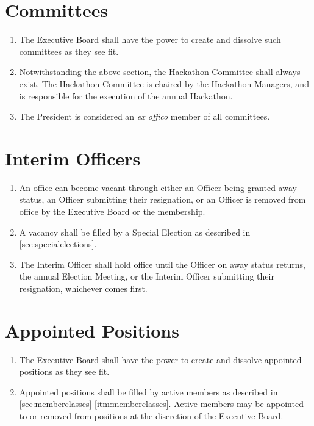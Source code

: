 \documentclass[12pt, letterpaper, oneside]{book}
\begin{document}
\section{Committees}
\begin{enumerate}
    \item The Executive Board shall have the power to create and dissolve such
        committees as they see fit.
    \item Notwithstanding the above section, the Hackathon Committee shall always
        exist. The Hackathon Committee is chaired by the Hackathon Managers, and
        is responsible for the execution of the annual Hackathon.
    \item The President is considered an \emph{ex offico} member of all
        committees.
\end{enumerate}

\section{Interim Officers}
\begin{enumerate}
    \item An office can become vacant through either an Officer being granted
        away status, an Officer submitting their resignation, or an Officer is
        removed from office by the Executive Board or the membership.
    \item A vacancy shall be filled by a Special Election as described in
        \cref{sec:specialelections}.
    \item The Interim Officer shall hold office until the Officer on away status
        returns, the annual Election Meeting, or the Interim Officer submitting
        their resignation, whichever comes first.
\end{enumerate}

\section{Appointed Positions}
\begin{enumerate}
    \item The Executive Board shall have the power to create and dissolve
        appointed positions as they see fit.
    \item Appointed positions shall be filled by active members as described in
        \cref{sec:memberclasses} \cref{itm:memberclasses}. Active members may be
        appointed to or removed from positions at the discretion of the
        Executive Board.
\end{enumerate}
\end{document}
